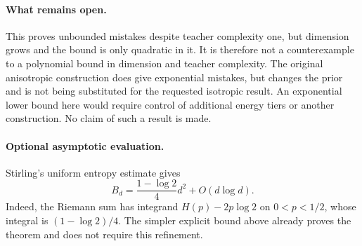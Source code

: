 \documentclass[11pt]{article}
\begin{document}
\paragraph{What remains open.}
This proves unbounded mistakes despite teacher complexity one, but dimension grows and the bound is only quadratic in it. It is therefore not a counterexample to a polynomial bound in dimension and teacher complexity. The original anisotropic construction does give exponential mistakes, but changes the prior and is not being substituted for the requested isotropic result. An exponential lower bound here would require control of additional energy tiers or another construction. No claim of such a result is made.

\paragraph{Optional asymptotic evaluation.}
Stirling's uniform entropy estimate gives
\[
 B_d=\frac{1-\log2}{4}d^2+O(d\log d).
\]
Indeed, the Riemann sum has integrand $H(p)-2p\log2$ on $0<p<1/2$, whose integral is $(1-\log2)/4$. The simpler explicit bound above already proves the theorem and does not require this refinement.
\end{document}
